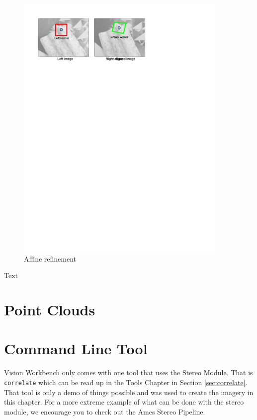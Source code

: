 \begin{figure}[h]
\begin{center}
  \includegraphics[trim = 0in 9in 3in 0in, width=4in]{images/stereo/affine_window.pdf}
\end{center}
  \caption{Affine refinement}
  \label{fig:affine_refinement}
\end{figure}

Text



\section{Point Clouds}
\label{sec:command_line_tools}

\section{Command Line Tool}
\label{sec:command_line_tool}

Vision Workbench only comes with one tool that uses the Stereo
Module. That is \verb#correlate# which can be read up in the Tools
Chapter in Section \ref{sec:correlate}. That tool is only a demo of
things possible and was used to create the imagery in this chapter. For
a more extreme example of what can be done with the stereo module, we
encourage you to check out the Ames Stereo Pipeline.

\begin{thebibliography}{1}

\end{thebibliography}
